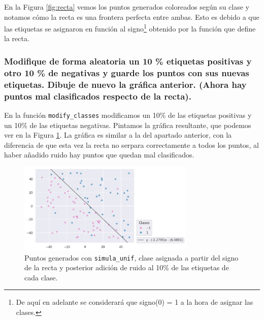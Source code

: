\documentclass[a4paper, 20pt]{article}
\begin{document}
En la Figura \ref{fig:recta} vemos los puntos generados coloreados según su clase y notamos cómo la recta es una frontera perfecta entre ambas. Esto es debido a que las etiquetas se asignaron en función al signo\footnote{De aquí en adelante se considerará que signo(0) = 1 a la hora de asignar las clases.} obtenido por la función que define la recta.

\subsubsection{Modifique de forma aleatoria un 10 \% etiquetas positivas y otro 10 \% de negativas y guarde los puntos con sus nuevas etiquetas. Dibuje de nuevo la gráfica anterior. (Ahora hay puntos mal clasificados respecto de la recta).}

En la función \texttt{modify\_classes} modificamos un 10\% de las etiquetas positivas y un 10\% de las etiquetas negativas. Pintamos la gráfica resultante, que podemos ver en la Figura \ref{fig:2b}. La gráfica es similar a la del apartado anterior, con la diferencia de que esta vez la recta no serpara correctamente a todos los puntos, al haber añadido ruido hay puntos que quedan mal clasificados.

\begin{figure}[H]
    \centering
    \includegraphics[width=0.75\textwidth]{recta+ruido}
    \caption{Puntos generados con \texttt{simula\_unif}, clase asignada a partir del signo de la recta y posterior adición de ruido al 10\% de las etiquetas de cada clase.}
    \label{fig:2b}
\end{figure}
\end{document}
